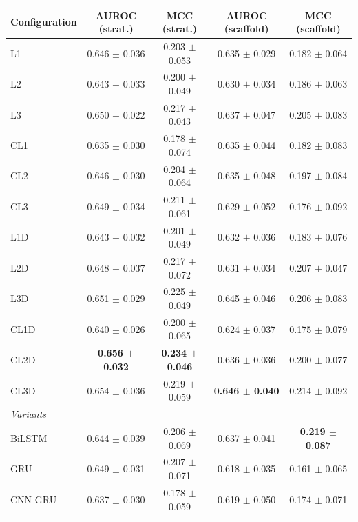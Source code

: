 \begin{tabular}{lcccc}
\toprule
Configuration & AUROC (strat.) & MCC (strat.) & AUROC (scaffold) & MCC (scaffold) \\
\midrule
L1 & 0.646 $\pm$ 0.036 & 0.203 $\pm$ 0.053 & 0.635 $\pm$ 0.029 & 0.182 $\pm$ 0.064 \\
L2 & 0.643 $\pm$ 0.033 & 0.200 $\pm$ 0.049 & 0.630 $\pm$ 0.034 & 0.186 $\pm$ 0.063 \\
L3 & 0.650 $\pm$ 0.022 & 0.217 $\pm$ 0.043 & 0.637 $\pm$ 0.047 & 0.205 $\pm$ 0.083 \\
CL1 & 0.635 $\pm$ 0.030 & 0.178 $\pm$ 0.074 & 0.635 $\pm$ 0.044 & 0.182 $\pm$ 0.083 \\
CL2 & 0.646 $\pm$ 0.030 & 0.204 $\pm$ 0.064 & 0.635 $\pm$ 0.048 & 0.197 $\pm$ 0.084 \\
CL3 & 0.649 $\pm$ 0.034 & 0.211 $\pm$ 0.061 & 0.629 $\pm$ 0.052 & 0.176 $\pm$ 0.092 \\
L1D & 0.643 $\pm$ 0.032 & 0.201 $\pm$ 0.049 & 0.632 $\pm$ 0.036 & 0.183 $\pm$ 0.076 \\
L2D & 0.648 $\pm$ 0.037 & 0.217 $\pm$ 0.072 & 0.631 $\pm$ 0.034 & 0.207 $\pm$ 0.047 \\
L3D & 0.651 $\pm$ 0.029 & 0.225 $\pm$ 0.049 & 0.645 $\pm$ 0.046 & 0.206 $\pm$ 0.083 \\
CL1D & 0.640 $\pm$ 0.026 & 0.200 $\pm$ 0.065 & 0.624 $\pm$ 0.037 & 0.175 $\pm$ 0.079 \\
CL2D & \textbf{0.656 $\pm$ 0.032} & \textbf{0.234 $\pm$ 0.046} & 0.636 $\pm$ 0.036 & 0.200 $\pm$ 0.077 \\
CL3D & 0.654 $\pm$ 0.036 & 0.219 $\pm$ 0.059 & \textbf{0.646 $\pm$ 0.040} & 0.214 $\pm$ 0.092 \\
\multicolumn{5}{l}{\emph{Variants}} \\
BiLSTM & 0.644 $\pm$ 0.039 & 0.206 $\pm$ 0.069 & 0.637 $\pm$ 0.041 & \textbf{0.219 $\pm$ 0.087} \\
GRU & 0.649 $\pm$ 0.031 & 0.207 $\pm$ 0.071 & 0.618 $\pm$ 0.035 & 0.161 $\pm$ 0.065 \\
CNN-GRU & 0.637 $\pm$ 0.030 & 0.178 $\pm$ 0.059 & 0.619 $\pm$ 0.050 & 0.174 $\pm$ 0.071 \\
\bottomrule
\end{tabular}
